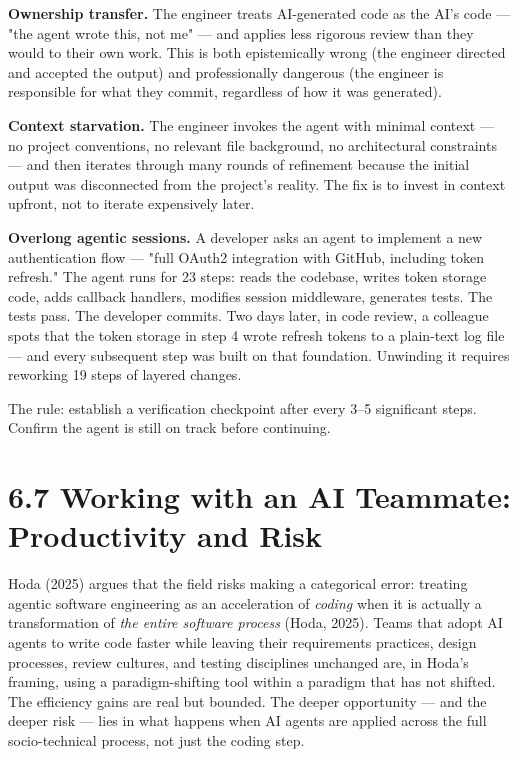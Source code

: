 \documentclass[11pt,a4paper]{book}
\begin{document}
\textbf{Ownership transfer.} The engineer treats AI-generated code as the AI's code --- "the agent wrote this, not me" --- and applies less rigorous review than they would to their own work. This is both epistemically wrong (the engineer directed and accepted the output) and professionally dangerous (the engineer is responsible for what they commit, regardless of how it was generated).

\textbf{Context starvation.} The engineer invokes the agent with minimal context --- no project conventions, no relevant file background, no architectural constraints --- and then iterates through many rounds of refinement because the initial output was disconnected from the project's reality. The fix is to invest in context upfront, not to iterate expensively later.

\textbf{Overlong agentic sessions.} A developer asks an agent to implement a new authentication flow --- "full OAuth2 integration with GitHub, including token refresh." The agent runs for 23 steps: reads the codebase, writes token storage code, adds callback handlers, modifies session middleware, generates tests. The tests pass. The developer commits. Two days later, in code review, a colleague spots that the token storage in step 4 wrote refresh tokens to a plain-text log file --- and every subsequent step was built on that foundation. Unwinding it requires reworking 19 steps of layered changes.

The rule: establish a verification checkpoint after every 3--5 significant steps. Confirm the agent is still on track before continuing.

\medskip

\section{6.7 Working with an AI Teammate: Productivity and Risk}

Hoda (2025) argues that the field risks making a categorical error: treating agentic software engineering as an acceleration of \textit{coding} when it is actually a transformation of \textit{the entire software process} (Hoda, 2025). Teams that adopt AI agents to write code faster while leaving their requirements practices, design processes, review cultures, and testing disciplines unchanged are, in Hoda's framing, using a paradigm-shifting tool within a paradigm that has not shifted. The efficiency gains are real but bounded. The deeper opportunity --- and the deeper risk --- lies in what happens when AI agents are applied across the full socio-technical process, not just the coding step.
\end{document}

